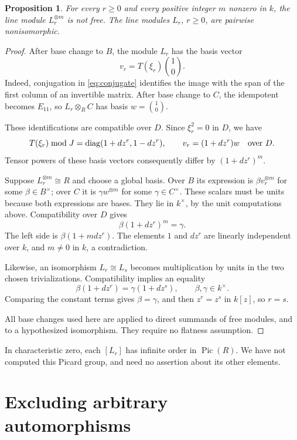 \documentclass[11pt]{article}
\newtheorem{proposition}[theorem]{Proposition}
\theoremstyle{remark}
\DeclareMathOperator{\Pic}{Pic}
\begin{document}
\begin{proposition}\label{prop:line}
For every $r\geq0$ and every positive integer $m$ nonzero in $k$, the line module $L_r^{\otimes m}$ is not free. The line modules $L_r$, $r\geq0$, are pairwise nonisomorphic.
\end{proposition}
\begin{proof}
After base change to $B$, the module $L_r$ has the basis vector
\[
 v_r=T(\xi_r)\binom10.
\]
Indeed, conjugation in \eqref{eq:conjugate} identifies the image with the span of the first column of an invertible matrix. After base change to $C$, the idempotent becomes $E_{11}$, so $L_r\otimes_R C$ has basis $w=\binom10$.

These identifications are compatible over $D$. Since $\xi_r^2=0$ in $D$, we have
\begin{equation}\label{eq:transition}
 T(\xi_r)\bmod J=\operatorname{diag}(1+dz^r,1-dz^r),
 \qquad v_r=(1+dz^r)w\quad\hbox{over }D.
\end{equation}
Tensor powers of these basis vectors consequently differ by $(1+dz^r)^m$.

Suppose $L_r^{\otimes m}\cong R$ and choose a global basis. Over $B$ its expression is $\beta v_r^{\otimes m}$ for some $\beta\in B^\times$; over $C$ it is $\gamma w^{\otimes m}$ for some $\gamma\in C^\times$. These scalars must be units because both expressions are bases. They lie in $k^\times$, by the unit computations above. Compatibility over $D$ gives
\[
 \beta(1+dz^r)^m=\gamma.
\]
The left side is $\beta(1+mdz^r)$. The elements $1$ and $dz^r$ are linearly independent over $k$, and $m\ne0$ in $k$, a contradiction.

Likewise, an isomorphism $L_r\cong L_s$ becomes multiplication by units in the two chosen trivializations. Compatibility implies an equality
\[
 \beta(1+dz^r)=\gamma(1+dz^s),\qquad \beta,\gamma\in k^\times.
\]
Comparing the constant terms gives $\beta=\gamma$, and then $z^r=z^s$ in $k[z]$, so $r=s$.

All base changes used here are applied to direct summands of free modules, and to a hypothesized isomorphism. They require no flatness assumption.
\end{proof}

In characteristic zero, each $[L_r]$ has infinite order in $\Pic(R)$. We have not computed this Picard group, and need no assertion about its other elements.

\section{Excluding arbitrary automorphisms}
\end{document}
